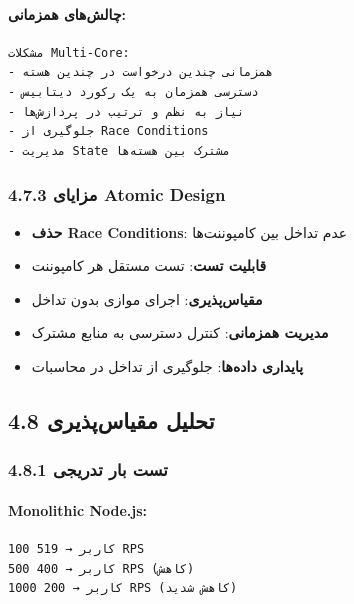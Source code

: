 \documentclass[
]{article}
\providecommand{\tightlist}{%
  \setlength{\itemsep}{0pt}\setlength{\parskip}{0pt}}
\begin{document}
\paragraph{چالش‌های
همزمانی:}\label{ux686ux627ux644ux634ux647ux627ux6cc-ux647ux645ux632ux645ux627ux646ux6cc}

\begin{verbatim}
مشکلات Multi-Core:
- همزمانی چندین درخواست در چندین هسته
- دسترسی همزمان به یک رکورد دیتابیس
- نیاز به نظم و ترتیب در پردازش‌ها
- جلوگیری از Race Conditions
- مدیریت State مشترک بین هسته‌ها
\end{verbatim}

\subsubsection{4.7.3 مزایای Atomic
Design}\label{ux645ux632ux627ux6ccux627ux6cc-atomic-design}

\begin{itemize}
\tightlist
\item
  \textbf{حذف Race Conditions}: عدم تداخل بین کامپوننت‌ها
\item
  \textbf{قابلیت تست}: تست مستقل هر کامپوننت
\item
  \textbf{مقیاس‌پذیری}: اجرای موازی بدون تداخل
\item
  \textbf{مدیریت همزمانی}: کنترل دسترسی به منابع مشترک
\item
  \textbf{پایداری داده‌ها}: جلوگیری از تداخل در محاسبات
\end{itemize}

\subsection{4.8 تحلیل
مقیاس‌پذیری}\label{ux62aux62dux644ux6ccux644-ux645ux642ux6ccux627ux633ux67eux630ux6ccux631ux6cc-1}

\subsubsection{4.8.1 تست بار
تدریجی}\label{ux62aux633ux62a-ux628ux627ux631-ux62aux62fux631ux6ccux62cux6cc}

\paragraph{Monolithic Node.js:}\label{monolithic-node.js}

\begin{verbatim}
100 کاربر → 519 RPS
500 کاربر → 400 RPS (کاهش)
1000 کاربر → 200 RPS (کاهش شدید)
\end{verbatim}
\end{document}
